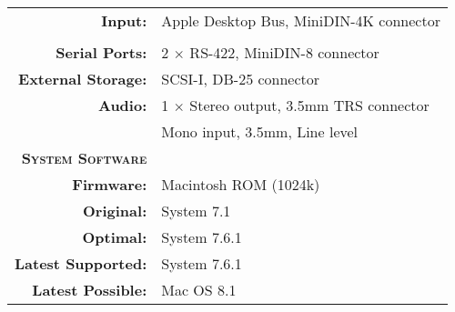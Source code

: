 \begin{tabular}{ r p{6in} }
\\
\textbf{Input:} & Apple Desktop Bus, MiniDIN-4K connector \\
\\
\textbf{Serial Ports:} & 2 \(\times\) RS-422, MiniDIN-8 connector \\
\textbf{External Storage:} & SCSI-I, DB-25 connector \\
\textbf{Audio:} & 1 \(\times\) Stereo output, 3.5mm TRS connector \\
~ & Mono input, 3.5mm, Line level
\\
\textbf{\textsc{System Software}} & ~ \\
\textbf{Firmware:} & Macintosh ROM (1024k) \\
\textbf{Original:} & System 7.1 \\
\textbf{Optimal:} & System 7.6.1 \\
\textbf{Latest Supported:} & System 7.6.1 \\
\textbf{Latest Possible:} & Mac OS 8.1 \\
\end{tabular}
